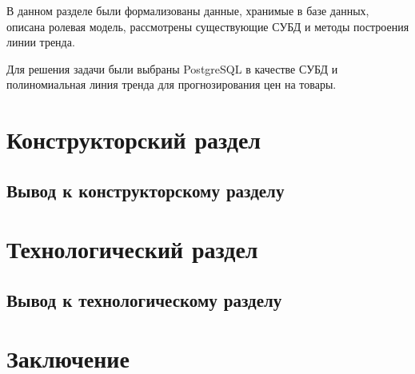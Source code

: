 \documentclass[a4paper,14pt]{extreport}
\begin{document}
В данном разделе были формализованы данные, хранимые в базе данных, описана ролевая модель, рассмотрены существующие СУБД и методы построения линии тренда.

Для решения задачи были выбраны PostgreSQL в качестве СУБД и полиномиальная линия тренда для прогнозирования цен на товары.

\chapter{Конструкторский раздел}

\section*{Вывод к конструкторскому разделу}

\chapter{Технологический раздел}

\section*{Вывод к технологическому разделу}

\chapter*{Заключение}


\newpage
{}
\renewcommand\bibname{Список литературы}
\end{document}
